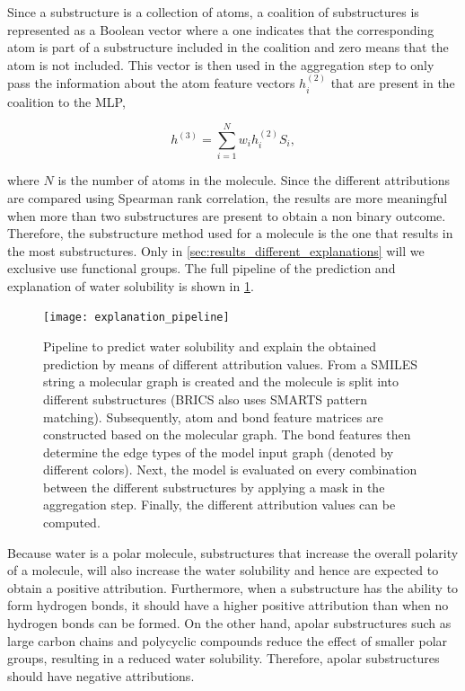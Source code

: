 Since a substructure is a collection of atoms, a coalition of substructures is represented 
as a Boolean vector where a one indicates that the corresponding atom is part of a substructure 
included in the coalition and zero means that the atom is not included. This vector 
is then used in the aggregation step to only pass the information about the atom feature 
vectors $h_i^{(2)}$ that are present in the coalition to the MLP,


\begin{equation}
    h^{(3)} = \sum_{i=1}^N w_i h_i^{(2)} S_i,
\end{equation}

where $N$ is the number of atoms in the molecule.
Since the different attributions are compared using Spearman rank correlation, the
results are more meaningful when more than two substructures are present to obtain a non binary 
outcome. Therefore, the substructure method used for a molecule is the one that results 
in the most substructures. Only in \cref{sec:results_different_explanations} will we exclusive 
use functional groups. The full pipeline of the prediction and explanation 
of water solubility is shown in \cref{fig:pipeline}.


\begin{figure}
    \centering 
    \texttt{[image: explanation\_pipeline]}
    \caption{Pipeline to predict water solubility and explain the obtained prediction by means 
        of different attribution values. From a SMILES string a molecular graph is created and 
        the molecule is split into different substructures (BRICS also uses SMARTS pattern matching).
        Subsequently, atom and bond feature matrices are constructed based on the molecular graph. The 
        bond features then determine the edge types of the model input graph (denoted by different colors).
        Next, the model is evaluated on every combination between the different substructures by applying
        a mask in the aggregation step. Finally, the different attribution values can be computed.
    }
    \label{fig:pipeline}
\end{figure}


Because water is a polar molecule, substructures that increase the overall polarity 
of a molecule, will also increase the water solubility and hence are expected to obtain 
a positive attribution. Furthermore, when a substructure has the ability to form hydrogen 
bonds, it should have a higher positive attribution than when no hydrogen bonds can be 
formed. On the other hand, apolar substructures such as large carbon chains and polycyclic
compounds reduce the effect of smaller polar groups, resulting in a reduced 
water solubility. Therefore, apolar substructures should have negative attributions. 


